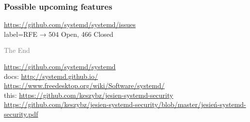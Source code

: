 \documentclass[serif]{beamer}
\begin{document}
\begin{frame}[fragile]
  \frametitle{Possible upcoming features}

  \href{https://github.com/systemd/systemd/issues?q=is%3Aissue+is%3Aopen+label%3A%22RFE+%F0%9F%8E%81%22}{https://github.com/systemd/systemd/issues} \\[1 em]
    label=RFE → 504 Open, 466 Closed
\end{frame}

\begin{frame}[fragile]
  \textcolor{gray}{The End}

  \bigskip

  \url{https://github.com/systemd/systemd}\\
  docs: \url{http://systemd.github.io/}\\
  \phantom{docs: }\url{https://www.freedesktop.org/wiki/Software/systemd/}\hspace*{-5cm}\\
  this: \url{https://github.com/keszybz/jesien-systemd-security}\hspace*{-5cm}
  \phantom{this: }\\
  \href{https://github.com/keszybz/jesien-systemd-security/blob/master/jesie%C5%84-systemd-security.pdf}{https://github.com/keszybz/jesien-systemd-security/blob/master/jesień-systemd-security.pdf}\hspace*{-5cm}
\end{frame}
\end{document}
